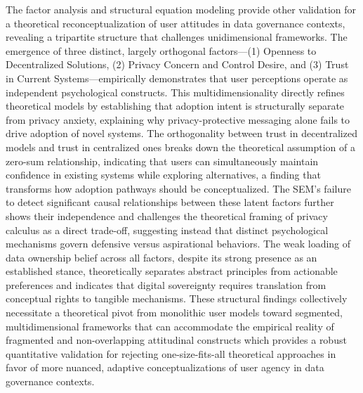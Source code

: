 	The factor analysis and structural equation modeling provide other validation for a theoretical reconceptualization of user attitudes in data governance contexts, revealing a tripartite structure that challenges unidimensional frameworks. The emergence of three distinct, largely orthogonal factors—(1) Openness to Decentralized Solutions, (2) Privacy Concern and Control Desire, and (3) Trust in Current Systems—empirically demonstrates that user perceptions operate as independent psychological constructs. This multidimensionality directly refines theoretical models by establishing that adoption intent is structurally separate from privacy anxiety, explaining why privacy-protective messaging alone fails to drive adoption of novel systems. The orthogonality between trust in decentralized models and trust in centralized ones breaks down the theoretical assumption of a zero-sum relationship, indicating that users can simultaneously maintain confidence in existing systems while exploring alternatives, a finding that transforms how adoption pathways should be conceptualized. The SEM's failure to detect significant causal relationships between these latent factors further shows their independence and challenges the theoretical framing of privacy calculus as a direct trade-off, suggesting instead that distinct psychological mechanisms govern defensive versus aspirational behaviors. The weak loading of data ownership belief across all factors, despite its strong presence as an established stance, theoretically separates abstract principles from actionable preferences and indicates that digital sovereignty requires translation from conceptual rights to tangible mechanisms. These structural findings collectively necessitate a theoretical pivot from monolithic user models toward segmented, multidimensional frameworks that can accommodate the empirical reality of fragmented and non-overlapping attitudinal constructs which provides a robust quantitative validation for rejecting one-size-fits-all theoretical approaches in favor of more nuanced, adaptive conceptualizations of user agency in data governance contexts.

